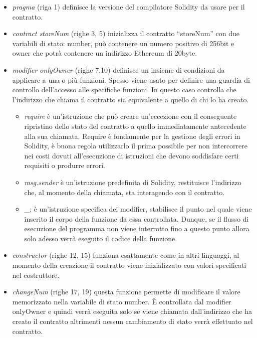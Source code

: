 \renewcommand\labelitemii{\textbullet}
\begin{itemize}
\item \emph{pragma} (riga 1) definisce la versione del compilatore Solidity da usare per il contratto.
\item \emph{contract storeNum} (righe 3, 5) inizializza il contratto “storeNum” con due variabili di stato: number, può contenere un numero positivo di 256bit e owner che potrà contenere un indirizzo Ethereum di 20byte.
\item \emph{modifier onlyOwner} (righe 7,10) definisce un insieme di condizioni da applicare a una o più funzioni. Spesso viene usato per definire una guardia di controllo dell'accesso alle specifiche funzioni. In questo caso controlla che l'indirizzo che chiama il contratto sia equivalente a quello di chi lo ha creato.
    \begin{itemize}
        \item \emph{require} è un'istruzione che può creare un'eccezione con il conseguente ripristino dello stato del contratto a quello immediatamente antecedente alla sua chiamata. Require è fondamente per la gestione degli errori in Solidity, è buona regola utilizzarlo il prima possibile per non intercorrere nei costi dovuti all'esecuzione di istruzioni che devono soddisfare certi requisiti o produrre errori. 
        \item \emph{msg.sender} è un'istruzione predefinita di Solidity, restituisce l'indirizzo che, al momento della chiamata, sta interagendo con il contratto.
        \item {\_}; è un'istruzione specifica dei modifier, stabilisce il punto nel quale viene inserito il corpo della funzione da essa controllata. Dunque, se il flusso di esecuzione del programma non viene interrotto fino a questo punto allora solo adesso verrà eseguito il codice della funzione.
    \end{itemize}
\item \emph{constructor} (righe 12, 15) funziona esattamente come in altri linguaggi, al momento della creazione il contratto viene inizializzato con valori specificati nel costruttore.
\item \emph{changeNum} (righe 17, 19) questa funzione permette di modificare il valore memorizzato nella variabile di stato number. È controllata dal modifier onlyOwner e quindi verrà eseguita solo se viene chiamata dall’indirizzo che ha creato il contratto altrimenti nessun cambiamento di stato verrà effettuato nel contratto. 
\end{itemize}

